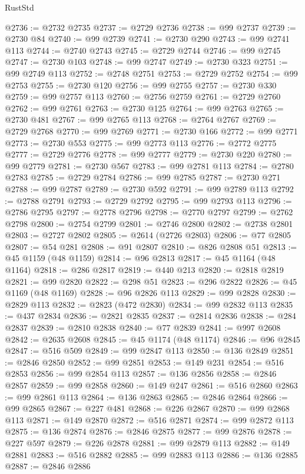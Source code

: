 \begin{lexlean}{RustStd}
\begin{coremodule}
@2736 := @2732 @2735
@2737 := @2729 @2736
@2738 := @99 @2737
@2739 := @2730 @84
@2740 := @99 @2739
@2741 := @2730 @290
@2743 := @99 @2741 @113
@2744 := @2740 @2743
@2745 := @2729 @2744
@2746 := @99 @2745
@2747 := @2730 @103
@2748 := @99 @2747
@2749 := @2730 @323
@2751 := @99 @2749 @113
@2752 := @2748 @2751
@2753 := @2729 @2752
@2754 := @99 @2753
@2755 := @2730 @120
@2756 := @99 @2755
@2757 := @2730 @330
@2759 := @99 @2757 @113
@2760 := @2756 @2759
@2761 := @2729 @2760
@2762 := @99 @2761
@2763 := @2730 @125
@2764 := @99 @2763
@2765 := @2730 @481
@2767 := @99 @2765 @113
@2768 := @2764 @2767
@2769 := @2729 @2768
@2770 := @99 @2769
@2771 := @2730 @166
@2772 := @99 @2771
@2773 := @2730 @553
@2775 := @99 @2773 @113
@2776 := @2772 @2775
@2777 := @2729 @2776
@2778 := @99 @2777
@2779 := @2730 @220
@2780 := @99 @2779
@2781 := @2730 @567
@2783 := @99 @2781 @113
@2784 := @2780 @2783
@2785 := @2729 @2784
@2786 := @99 @2785
@2787 := @2730 @271
@2788 := @99 @2787
@2789 := @2730 @592
@2791 := @99 @2789 @113
@2792 := @2788 @2791
@2793 := @2729 @2792
@2795 := @99 @2793 @113
@2796 := @2786 @2795
@2797 := @2778 @2796
@2798 := @2770 @2797
@2799 := @2762 @2798
@2800 := @2754 @2799
@2801 := @2746 @2800
@2802 := @2738 @2801
@2803 := @2727 @2802
@2805 := @2614 (@2726 @2803)
@2806 := @77 @2805
@2807 := @54 @281
@2808 := @91 @2807
@2810 := @826 @2808 @51
@2813 := @45 @1159 (@48 @1159)
@2814 := @96 @2813
@2817 := @45 @1164 (@48 @1164)
@2818 := @286 @2817
@2819 := @440 @213
@2820 := @2818 @2819
@2821 := @99 @2820
@2822 := @298 @51
@2823 := @296 @2822
@2826 := @45 @1169 (@48 @1169)
@2828 := @96 @2826 @113
@2829 := @99 @2828
@2830 := @2829 @113
@2832 := @2823 (@472 @2830)
@2834 := @99 @2832 @113
@2835 := @437 @2834
@2836 := @2821 @2835
@2837 := @2814 @2836
@2838 := @284 @2837
@2839 := @2810 @2838
@2840 := @77 @2839
@2841 := @997 @2608
@2842 := @2635 @2608
@2845 := @45 @1174 (@48 @1174)
@2846 := @96 @2845
@2847 := @516 @509
@2849 := @99 @2847 @113
@2850 := @136 @2849
@2851 := @2846 @2850
@2852 := @99 @2851
@2853 := @149 @231
@2854 := @516 @2853
@2856 := @99 @2854 @113
@2857 := @136 @2856
@2858 := @2846 @2857
@2859 := @99 @2858
@2860 := @149 @247
@2861 := @516 @2860
@2863 := @99 @2861 @113
@2864 := @136 @2863
@2865 := @2846 @2864
@2866 := @99 @2865
@2867 := @227 @481
@2868 := @226 @2867
@2870 := @99 @2868 @113
@2871 := @149 @2870
@2872 := @516 @2871
@2874 := @99 @2872 @113
@2875 := @136 @2874
@2876 := @2846 @2875
@2877 := @99 @2876
@2878 := @227 @597
@2879 := @226 @2878
@2881 := @99 @2879 @113
@2882 := @149 @2881
@2883 := @516 @2882
@2885 := @99 @2883 @113
@2886 := @136 @2885
@2887 := @2846 @2886

\end{coremodule}
\end{lexlean}
